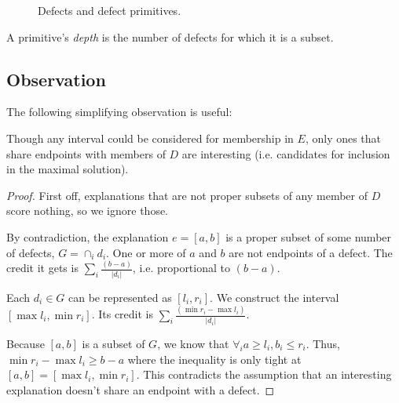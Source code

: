 \begin{figure}[H] \centering
  \caption{{\color{green} Defects} and {\color{blue} defect primitives}.}
  \label{fig:defectPrimitives}
\end{figure}

A primitive's {\it depth} is the number of defects for which it is a subset.  

\subsection{Observation}

The following simplifying observation is useful:

\begin{lem} \label{lemma:Maximal}
Though any interval could be considered for membership in $E$, only ones that share endpoints with members of $D$ are interesting (i.e. candidates for inclusion in the maximal solution).  
\end{lem}

\begin{proof}
First off, explanations that are not proper subsets of any member of $D$ score nothing, so we ignore those.

By contradiction, the explanation $e = [a,b]$ is a proper subset of some number of defects, $G = \cap_i d_i$.  One or more of $a$ and $b$ are not endpoints of a defect.  The credit it gets is $\sum_i \frac{ (b-a) }{|d_i|} $, i.e. proportional to $(b-a)$.

Each $d_i \in G$ can be represented as $[l_i,r_i]$.  We construct the interval $[\max{l_i}, \min{r_i}]$.  Its credit is $\sum_i \frac{ (\min{r_i} - \max{l_i} ) }{|d_i|} $.  

Because $[a,b]$ is a subset of $G$, we know that $\forall_i a \geq l_i, b_i \leq r_i$.  Thus, $\min{r_i} - \max{l_i} \geq b-a$ where the inequality is only tight at $[a,b] = [\max{l_i}, \min{r_i}]$.  This contradicts the assumption that an interesting explanation doesn't share an endpoint with a defect.
\end{proof}

